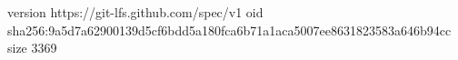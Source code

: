 version https://git-lfs.github.com/spec/v1
oid sha256:9a5d7a62900139d5cf6bdd5a180fca6b71a1aca5007ee8631823583a646b94cc
size 3369
